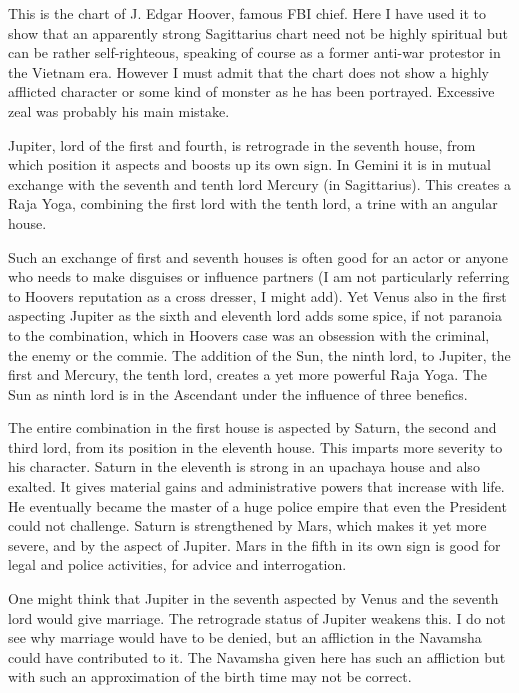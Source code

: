  

This is the chart of J. Edgar Hoover, famous FBI chief. Here I have used it to show that an apparently strong Sagittarius chart need not be highly spiritual but can be rather self-righteous, speaking of course as a former anti-war protestor in the Vietnam era. However I must admit that the chart does not show a highly afflicted character or some kind of monster as he has been portrayed. Excessive zeal was probably his main mistake.

 

Jupiter, lord of the first and fourth, is retrograde in the seventh house, from which position it aspects and boosts up its own sign. In Gemini it is in mutual exchange with the seventh and tenth lord Mercury (in Sagittarius). This creates a Raja Yoga, combining the first lord with the tenth lord, a trine with an angular house.

 

Such an exchange of first and seventh houses is often good for an actor or anyone who needs to make disguises or influence partners (I am not particularly referring to Hoovers reputation as a cross dresser, I might add). Yet Venus also in the first aspecting Jupiter as the sixth and eleventh lord adds some spice, if not paranoia to the combination, which in Hoovers case was an obsession with the criminal, the enemy or the commie. The addition of the Sun, the ninth lord, to Jupiter, the first and Mercury, the tenth lord, creates a yet more powerful Raja Yoga. The Sun as ninth lord is in the Ascendant under the influence of three benefics.

 

The entire combination in the first house is aspected by Saturn, the second and third lord, from its position in the eleventh house. This imparts more severity to his character. Saturn in the eleventh is strong in an upachaya house and also exalted. It gives material gains and administrative powers that increase with life. He eventually became the master of a huge police empire that even the President could not challenge. Saturn is strengthened by Mars, which makes it yet more severe, and by the aspect of Jupiter. Mars in the fifth in its own sign is good for legal and police activities, for advice and interrogation.

 

One might think that Jupiter in the seventh aspected by Venus and the seventh lord would give marriage. The retrograde status of Jupiter weakens this. I do not see why marriage would have to be denied, but an affliction in the Navamsha could have contributed to it. The Navamsha given here has such an affliction but with such an approximation of the birth time may not be correct.

